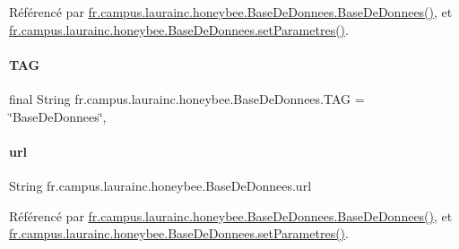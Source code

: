 Référencé par \hyperlink{classfr_1_1campus_1_1laurainc_1_1honeybee_1_1_base_de_donnees_a2f6274017a47cc8f331c582f9a7ad6d1}{fr.\+campus.\+laurainc.\+honeybee.\+Base\+De\+Donnees.\+Base\+De\+Donnees()}, et \hyperlink{classfr_1_1campus_1_1laurainc_1_1honeybee_1_1_base_de_donnees_a0960cb9d71647e80e195a580f90cd0d6}{fr.\+campus.\+laurainc.\+honeybee.\+Base\+De\+Donnees.\+set\+Parametres()}.

\mbox{\label{classfr_1_1campus_1_1laurainc_1_1honeybee_1_1_base_de_donnees_ae800d867b3e423dd139e982736ab5587}} 
\paragraph{\texorpdfstring{T\+AG}{TAG}}
{\footnotesize\ttfamily final String fr.\+campus.\+laurainc.\+honeybee.\+Base\+De\+Donnees.\+T\+AG = \char`\"{}Base\+De\+Donnees\char`\"{}\hspace{0.3cm}{\ttfamily [static]}, {\ttfamily [private]}}

\mbox{\label{classfr_1_1campus_1_1laurainc_1_1honeybee_1_1_base_de_donnees_ad1d04b4da375002e91d8370b9d19918e}} 
\paragraph{\texorpdfstring{url}{url}}
{\footnotesize\ttfamily String fr.\+campus.\+laurainc.\+honeybee.\+Base\+De\+Donnees.\+url\hspace{0.3cm}{\ttfamily [private]}}



Référencé par \hyperlink{classfr_1_1campus_1_1laurainc_1_1honeybee_1_1_base_de_donnees_a2f6274017a47cc8f331c582f9a7ad6d1}{fr.\+campus.\+laurainc.\+honeybee.\+Base\+De\+Donnees.\+Base\+De\+Donnees()}, et \hyperlink{classfr_1_1campus_1_1laurainc_1_1honeybee_1_1_base_de_donnees_a0960cb9d71647e80e195a580f90cd0d6}{fr.\+campus.\+laurainc.\+honeybee.\+Base\+De\+Donnees.\+set\+Parametres()}.


